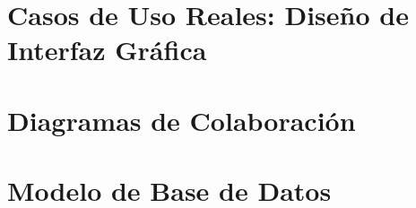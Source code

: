 \documentclass[12pt, a4paper]{article}
\begin{document}
\part{Casos de Uso Reales: Diseño de Interfaz Gráfica}


\part{Diagramas de Colaboración}


\part{Modelo de Base de Datos}

\end{document}
